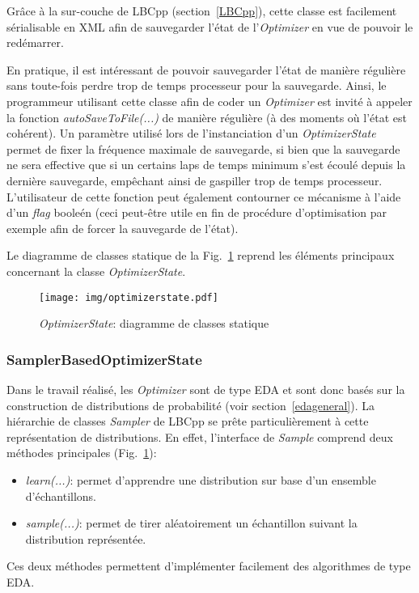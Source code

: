 \documentclass[a4paper, 12pt]{report}
\begin{document}
Grâce à la sur-couche de LBCpp (section~\ref{LBCpp}), cette classe est facilement sérialisable en XML afin de sauvegarder l'état de l'\textit{Optimizer} en vue de pouvoir le redémarrer. 

En pratique, il est intéressant de pouvoir sauvegarder l'état de manière régulière sans toute-fois perdre trop de temps processeur pour la sauvegarde. Ainsi, le programmeur utilisant cette classe afin de coder un \textit{Optimizer} est invité à appeler la fonction \textit{autoSaveToFile(...)} de manière régulière (à des moments où l'état est cohérent). Un paramètre utilisé lors de l'instanciation d'un \textit{OptimizerState} permet de fixer la fréquence maximale de sauvegarde, si bien que la sauvegarde ne sera effective que si un certains laps de temps minimum s'est écoulé depuis la dernière sauvegarde, empêchant ainsi de gaspiller trop de temps processeur. L'utilisateur de cette fonction peut également contourner ce mécanisme à l'aide d'un \textit{flag} booleén (ceci peut-être utile en fin de procédure d'optimisation par exemple afin de forcer la sauvegarde de l'état). 

Le diagramme de classes statique de la Fig.~\ref{optimizerstate} reprend les éléments principaux concernant la classe \textit{OptimizerState}.

\begin{figure}[!tb]
\centering
\texttt{[image: img/optimizerstate.pdf]}
\caption{\textit{OptimizerState}: diagramme de classes statique}
\label{optimizerstate}
\end{figure}

\subsubsection{SamplerBasedOptimizerState} 
Dans le travail réalisé, les \textit{Optimizer} sont de type EDA et sont donc basés sur la construction de distributions de probabilité (voir section~\ref{edageneral}). La hiérarchie de classes \textit{Sampler} de LBCpp se prête particulièrement à cette représentation de distributions. En effet, l'interface de \textit{Sample} comprend deux méthodes principales (Fig.~\ref{optimizerstate}):
\begin{itemize}
\item \textit{learn(...)}: permet d'apprendre une distribution sur base d'un ensemble d'échantillons.
\item \textit{sample(...)}: permet de tirer aléatoirement un échantillon suivant la distribution représentée.
\end{itemize}
Ces deux méthodes permettent d'implémenter facilement des algorithmes de type EDA. %
\end{document}
